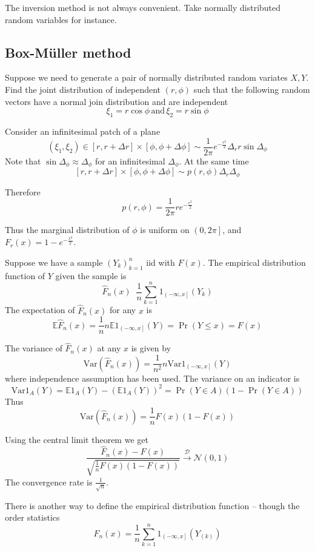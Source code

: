 \documentclass[a4paper]{article}
\newcommand{\clo}[1]{{\left [ #1 \right ]}}
\newcommand{\ploc}[1]{{\left ( #1 \right ]}}
\newcommand{\brac}[1]{{\left ( #1 \right )}}
\newcommand{\ex}{\mathbb{E}}
\newcommand{\Var}{\text{Var}}
\newcommand{\defn}{\mathop{\overset{\Delta}{=}}\nolimits}
\begin{document}
The inversion method is not always convenient. Take normally distributed random variables for instance.


\subsection{Box-M\"uller method} %
\label{sub:box_muller_method}

Suppose we need to generate a pair of normally distributed random variates $X,Y$.
Find the joint distribution of independent $(r,\phi)$ such that the following random
vectors have a normal join distribution and are independent
\[\xi_1 = r \cos\phi\,\text{and}\,\xi_2 = r \sin\phi\]

Consider an infinitesimal patch of a plane
\[(\xi_1, \xi_2)\in\clo{r,r+\Delta r}\times \clo{\phi,\phi+\Delta \phi}\sim
\frac{1}{2\pi} e^{-\frac{r^2}{2}} \Delta_r r\sin \Delta_\phi\]
Note that $\sin\Delta_\phi\approx \Delta_\phi$ for an infinitesimal $\Delta_\phi$. At the same time
\[\clo{r,r+\Delta r}\times \clo{\phi,\phi+\Delta \phi} \sim p(r,\phi) \Delta_r\Delta_\phi\] 

Therefore
\[p(r,\phi) = \frac{1}{2\pi} r e^{-\frac{r^2}{2}}\]

Thus the marginal distribution of $\phi$ is uniform on $\ploc{0,2\pi}$, and $F_r(x) = 1 - e^{-\frac{x^2}{2}}$.


Suppose we have a sample $\brac{Y_k}_{k=1}^n$ iid with $F(x)$. The empirical distribution function of $Y$ given the sample is 
\[\hat{F}_n(x) \defn \frac{1}{n}\sum_{k=1}^n 1_\ploc{-\infty, x}(Y_k)\]
The expectation of $\hat{F}_n(x)$ for any $x$ is 
\[\ex \hat{F}_n(x) = \frac{1}{n} n \ex1_\ploc{-\infty, x}(Y) = \Pr\brac{Y\leq x} = F(x)\]

The variance of $\hat{F}_n(x)$ at any $x$ is given by
\[\Var\brac{\hat{F}_n(x)} = \frac{1}{n^2}n \Var{1_\ploc{-\infty, x}(Y)}\]
where independence assumption has been used.
The variance on an indicator is
\[\Var{1_A(Y)} = \ex 1_A(Y) - \brac{\ex 1_A(Y)}^2 = \Pr(Y\in A)\brac{1-\Pr(Y\in A)}\]
Thus \[\Var\brac{\hat{F}_n(x)} = \frac{1}{n} F(x)\brac{1-F(x)}\]

Using the central limit theorem we get
\[\frac{\hat{F}_n(x) - F(x)}{\sqrt{\frac{1}{n} F(x)\brac{1-F(x)}}}\overset{\mathcal{D}}{\to} \mathcal{N}(0,1)\]
The convergence rate is $\frac{1}{\sqrt{n}}$.

There is another way to define the empirical distribution function -- though the order statistics
\[\hat{F}_n(x) = \frac{1}{n}\sum_{k=1}^n 1_\ploc{-\infty,x}(Y_{(k)})\]
\end{document}
